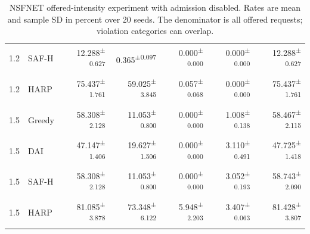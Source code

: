 \documentclass[final,5p]{elsarticle}
\begin{document}
\begin{table}[p]
\begin{tabular}{llrrrrr}
1.2 & SAF-H & 12.288\textsuperscript{$\pm$0.627} & 0.365\textsuperscript{$\pm$0.097} & 0.000\textsuperscript{$\pm$0.000} & 0.000\textsuperscript{$\pm$0.000} & 12.288\textsuperscript{$\pm$0.627} \\
1.2 & HARP & 75.437\textsuperscript{$\pm$1.761} & 59.025\textsuperscript{$\pm$3.845} & 0.057\textsuperscript{$\pm$0.068} & 0.000\textsuperscript{$\pm$0.000} & 75.437\textsuperscript{$\pm$1.761} \\
1.5 & Greedy & 58.308\textsuperscript{$\pm$2.128} & 11.053\textsuperscript{$\pm$0.800} & 0.000\textsuperscript{$\pm$0.000} & 1.008\textsuperscript{$\pm$0.138} & 58.467\textsuperscript{$\pm$2.115} \\
1.5 & DAI & 47.147\textsuperscript{$\pm$1.406} & 19.627\textsuperscript{$\pm$1.506} & 0.000\textsuperscript{$\pm$0.000} & 3.110\textsuperscript{$\pm$0.491} & 47.725\textsuperscript{$\pm$1.418} \\
1.5 & SAF-H & 58.308\textsuperscript{$\pm$2.128} & 11.053\textsuperscript{$\pm$0.800} & 0.000\textsuperscript{$\pm$0.000} & 3.052\textsuperscript{$\pm$0.193} & 58.743\textsuperscript{$\pm$2.090} \\
1.5 & HARP & 81.085\textsuperscript{$\pm$3.878} & 73.348\textsuperscript{$\pm$6.122} & 5.948\textsuperscript{$\pm$2.203} & 3.407\textsuperscript{$\pm$0.063} & 81.428\textsuperscript{$\pm$3.807} \\
\bottomrule
\end{tabular}
\caption{NSFNET offered-intensity experiment with admission disabled. Rates are mean and sample SD in percent over 20 seeds. The denominator is all offered requests; violation categories can overlap.}
\label{tab:load_sweep_unprotected_nsfnet}
\end{table}
\end{document}
